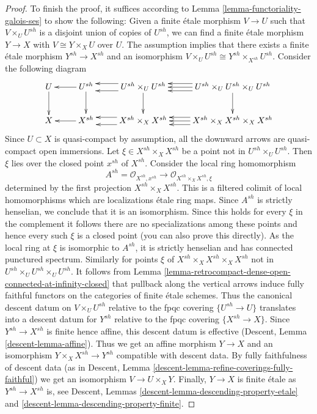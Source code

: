 \begin{proof}
\medskip\noindent
To finish the proof, it suffices according to
Lemma \ref{lemma-functoriality-galois-ses}
to show the following: Given a finite \'etale morphism
$V \to U$ such that $V \times_U U^{sh}$ is a disjoint
union of copies of $U^{sh}$, we can find a finite \'etale
morphism $Y \to X$ with $V \cong Y \times_X U$ over $U$.
The assumption implies that there exists a finite \'etale
morphism $Y^{sh} \to X^{sh}$ and an isomorphism
$V \times_U U^{sh} \cong Y^{sh} \times_{X^{sh}} U^{sh}$.
Consider the following diagram
$$
\xymatrix{
U \ar[d] & U^{sh} \ar[d] \ar[l] &
U^{sh} \times_U U^{sh} \ar[d] \ar@<1ex>[l] \ar@<-1ex>[l] &
U^{sh} \times_U U^{sh} \times_U U^{sh}
\ar[d] \ar@<1ex>[l] \ar[l] \ar@<-1ex>[l] \\
X & X^{sh} \ar[l] &
X^{sh} \times_X X^{sh} \ar@<1ex>[l] \ar@<-1ex>[l] &
X^{sh} \times_X X^{sh} \times_X X^{sh} \ar@<1ex>[l] \ar[l] \ar@<-1ex>[l]
}
$$
Since $U \subset X$ is quasi-compact by assumption, all the
downward arrows are quasi-compact open immersions.
Let $\xi \in X^{sh} \times_X X^{sh}$ be a point not
in $U^{sh} \times_U U^{sh}$. Then $\xi$ lies over the closed
point $x^{sh}$ of $X^{sh}$.
Consider the local ring homomorphism
$$
A^{sh} = \mathcal{O}_{X^{sh}, x^{sh}} \to
\mathcal{O}_{X^{sh} \times_X X^{sh}, \xi}
$$
determined by the first projection $X^{sh} \times_X X^{sh}$.
This is a filtered colimit of local homomorphisms which are
localizations \'etale ring maps.
Since $A^{sh}$ is strictly henselian, we conclude that it is an
isomorphism. Since this holds for every $\xi$ in the complement
it follows there are no specializations among these points and
hence every such $\xi$ is a closed point (you can also prove
this directly). As the local ring at $\xi$ is isomorphic
to $A^{sh}$, it is strictly henselian and has connected punctured spectrum.
Similarly for points $\xi$ of $X^{sh} \times_X X^{sh} \times_X X^{sh}$ not
in $U^{sh} \times_U U^{sh} \times_U U^{sh}$. It follows from
Lemma \ref{lemma-retrocompact-dense-open-connected-at-infinity-closed}
that pullback along the vertical arrows induce fully faithful functors on
the categories of finite \'etale schemes. Thus the
canonical descent datum on $V \times_U U^{sh}$ relative to
the fpqc covering $\{U^{sh} \to U\}$ translates into a
descent datum for $Y^{sh}$ relative to the fpqc covering $\{X^{sh} \to X\}$.
Since $Y^{sh} \to X^{sh}$ is finite hence affine, this descent datum is
effective (Descent, Lemma \ref{descent-lemma-affine}).
Thus we get an affine morphism $Y \to X$ and an isomorphism
$Y \times_X X^{sh} \to Y^{sh}$ compatible with descent data.
By fully faithfulness of descent data
(as in Descent, Lemma \ref{descent-lemma-refine-coverings-fully-faithful})
we get an isomorphism $V \to U \times_X Y$.
Finally, $Y \to X$ is finite \'etale as $Y^{sh} \to X^{sh}$ is, see
Descent, Lemmas \ref{descent-lemma-descending-property-etale} and
\ref{descent-lemma-descending-property-finite}.
\end{proof}

